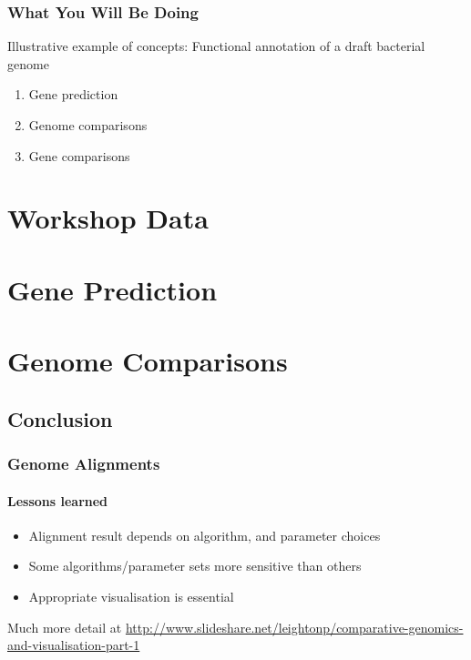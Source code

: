 \begin{frame}
  \frametitle{What You Will Be Doing}
  Illustrative example of concepts: Functional annotation of a draft bacterial genome
  \begin{enumerate}
    \item Gene prediction
    \item Genome comparisons
    \item Gene comparisons
  \end{enumerate}
\end{frame}

\section{Workshop Data}
  
  

\section{Gene Prediction}
  
  
  
  

\section{Genome Comparisons}
  
  

\subsection{Conclusion}
\begin{frame}
  \frametitle{Genome Alignments}   
  \framesubtitle{Lessons learned}   
  \begin{itemize}
    \item Alignment result depends on algorithm, and parameter choices
    \item Some algorithms/parameter sets more sensitive than others
    \item Appropriate visualisation is essential
  \end{itemize}
  Much more detail at \url{http://www.slideshare.net/leightonp/comparative-genomics-and-visualisation-part-1}
\end{frame}


